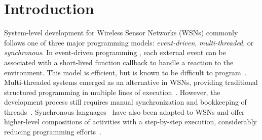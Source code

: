 \documentclass[letterpaper]{sig-alternate}
\begin{document}


\section{Introduction}
\label{sec.intro}

System-level development for Wireless Sensor Networks (WSNs) commonly follows 
one of three major programming models: \emph{event-driven}, 
\emph{multi-threaded}, or \emph{synchronous}.
%
In event-driven programming \cite{wsn.tos,wsn.contiki}, each external event can 
be associated with a short-lived function callback to handle a reaction to the 
environment.
This model is efficient,
but is known to be difficult to 
program~\cite{sync_async.cooperative,wsn.protothreads}.
%
Multi-threaded systems emerged as an alternative in WSNs, providing traditional 
structured programming in multiple lines of 
execution~\cite{wsn.protothreads,wsn.mantisos}.
However, the development process still requires manual synchronization and 
bookkeeping of threads~\cite{sync_async.threadsproblems}.
%
Synchronous languages~\cite{rp.twelve} have also been adapted to WSNs and offer 
higher-level compositions of activities with a step-by-step execution, 
considerably reducing programming efforts~\cite{wsn.sol,wsn.osm}.
\end{document}
